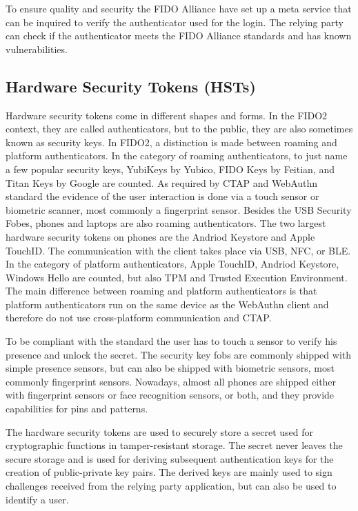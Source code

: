 \documentclass[runningheads]{llncs}
\begin{document}
To ensure quality and security the FIDO Alliance have set up a meta service that can be inquired to verify the authenticator used for the login. The relying party can check if the authenticator meets the FIDO Alliance standards and has known vulnerabilities.\cite{9099190}

\subsection{Hardware Security Tokens (HSTs)}
Hardware security tokens come in different shapes and forms. In the FIDO2 context, they are called authenticators, but to the public, they are also sometimes known as security keys. In FIDO2, a distinction is made between roaming and platform authenticators. In the category of roaming authenticators, to just name a few popular security keys, YubiKeys by Yubico, FIDO Keys by Feitian, and Titan Keys by Google are counted. As required by CTAP and WebAuthn standard the evidence of the user interaction is done via a touch sensor or biometric scanner, most commonly a fingerprint sensor. Besides the USB Security Fobes, phones and laptops are also roaming authenticators. The two largest hardware security tokens on phones are the Andriod Keystore and Apple TouchID. The communication with the client takes place via USB, NFC, or BLE.
In the category of platform authenticators, Apple TouchID, Andriod Keystore, Windows Hello are counted, but also TPM and Trusted Execution Environment. The main difference between roaming and platform authenticators is that platform authenticators run on the same device as the WebAuthn client and therefore do not use cross-platform communication and CTAP. \cite{9152694}

To be compliant with the standard the user has to touch a sensor to verify his presence and unlock the secret. The security key fobs are commonly shipped with simple presence sensors, but can also be shipped with biometric sensors, most commonly fingerprint sensors. Nowadays, almost all phones are shipped either with fingerprint sensors or face recognition sensors, or both, and they provide capabilities for pins and patterns.

The hardware security tokens are used to securely store a secret used for cryptographic functions in tamper-resistant storage. The secret never leaves the secure storage and is used for deriving subsequent authentication keys for the creation of public-private key pairs. The derived keys are mainly used to sign challenges received from the relying party application, but can also be used to identify a user.\cite{272198}
\end{document}
